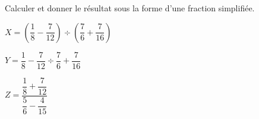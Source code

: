 \begin{exercice*}
    Calculer et donner le résultat sous la forme d'une fraction simplifiée.
    
    \begin{minipage}{0.6\linewidth}
        \begin{list}{}{}
            \begin{spacing}{2}
                \item $X = \left(\dfrac18 - \dfrac{7}{12}\right)  \div  \left(\dfrac{7}{6}+\dfrac{7}{16}\right)$
                \item $Y = \dfrac18 - \dfrac{7}{12}  \div  \dfrac{7}{6}+\dfrac{7}{16}$
            \end{spacing}
        \end{list}
    \end{minipage}
    \begin{minipage}{0.4\linewidth}
        $Z = \dfrac{\dfrac18 + \dfrac{7}{12}}{\dfrac{5}{6}-\dfrac{4}{15}}$
    \end{minipage}
        
\end{exercice*}
